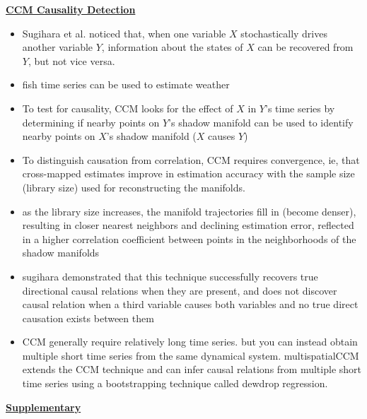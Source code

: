 \documentclass[10pt,a4paper]{article}
\begin{document}
\noindent\underline{\textbf{CCM Causality Detection}}
\begin{itemize}
\item Sugihara et al. noticed that, when one variable $X$ stochastically drives another variable $Y$, information about the states of $X$ can be recovered from $Y$, but not vice versa.
	\item fish time series can be used to estimate weather
\item To test for causality, CCM looks for the effect of $X$ in $Y$’s time series by determining if nearby points on $Y$’s shadow manifold can be used to identify nearby points on $X$’s shadow manifold ($X$ causes $Y$)
\item To distinguish causation from correlation, CCM requires convergence, ie, that cross-mapped estimates improve in estimation accuracy with the sample size (library size) used for reconstructing the manifolds.

\item as the library size increases, the manifold trajectories fill in (become denser), resulting in closer nearest neighbors and declining estimation error, reflected in a higher correlation coefficient between points in the neighborhoods of the shadow manifolds

\item sugihara demonstrated that this technique successfully recovers true directional causal relations when they are present, and does not discover causal relation when a third variable causes both variables and no true direct causation exists between them

\item CCM generally require relatively long time series. but you can instead obtain multiple short time series from the same dynamical system. multispatialCCM extends the CCM technique and can infer causal relations from multiple short time series using a bootstrapping technique called dewdrop regression.
\end{itemize}
\noindent\underline{\textbf{Supplementary}}
\end{document}
